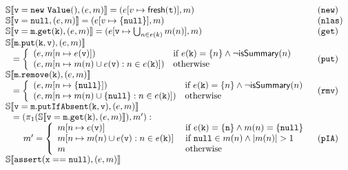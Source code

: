 \begin{figure*}[t]
\[
\begin{array}{ll}
\mathbb{S}\llbracket \mathtt{v = new\ Value()}, (e, m) \rrbracket
=  (e[v \mapsto \mathsf{fresh}(\mathtt{t})], m)& (\mathtt{new})\\
\mathbb{S}\llbracket \mathtt{v = null}, (e, m) \rrbracket
= (e[v \mapsto \{\mathtt{null}\}], m)& (\mathtt{nlas})\\
\mathbb{S}\llbracket \mathtt{v=m.get(k)}, (e, m) \rrbracket
= (e[\mathtt{v} \mapsto \bigcup_{n \in e(k)} m(n)], m) & (\mathtt{get})\\
  \mathbb{S}\llbracket \mathtt{m.put(k, v)}, (e, m) \rrbracket\\
  \;\;\;=\left\{
\begin{array}{ll}
(e, m[n \mapsto e(\mathtt{v})]) & \textrm{if } e(\mathtt{k})=\{n\} \land \neg \mathsf{isSummary}(n)\\
(e, m[n \mapsto m(n) \cup e(\mathtt{v}) : n \in e(\mathtt{k})]) & \textrm{otherwise}\\
\end{array}
\right. & (\mathtt{put})\\
\mathbb{S}\llbracket \mathtt{m.remove(k)}, (e, m) \rrbracket\\
\;\;\;=  \left\{
\begin{array}{ll}
(e, m[n \mapsto \{\mathtt{null}\}]) & \textrm{if } e(\mathtt{k})=\{n\} \land \neg \mathsf{isSummary}(n)\\
(e, m[n \mapsto m(n) \cup \{\mathtt{null}\} : n \in e(\mathtt{k})]) & \textrm{otherwise}\\
\end{array}
\right. & (\mathtt{rmv})\\ 
\mathbb{S}\llbracket \mathtt{v = m.putIfAbsent(k, v)}, (e, m) \rrbracket\\
\;\;\;=  (\pi_1(\mathbb{S}\llbracket \mathtt{v = m.get(k)}, (e, m) \rrbracket), m') : & \\
\hspace{20pt} 
m'=
\left\{
\begin{array}{ll}
m[n \mapsto e(\mathtt{v})] & \textrm{ if } e(\mathtt{k})=\{\mathtt{n}\} \land m(n) = \{\mathtt{null}\}\\
m[n \mapsto m(n) \cup e(\mathtt{v}) : n \in e(\mathtt{k})] & \textrm{ if } \mathtt{null} \in m(n) \land |m(n)| > 1\\
m & \textrm{ otherwise}\\
\end{array}
\right. & (\mathtt{pIA})\\
\mathbb{S}\llbracket \mathtt{assert(x==null)}, (e, m) \rrbracket\\

\end{array}\]
\end{figure*}
